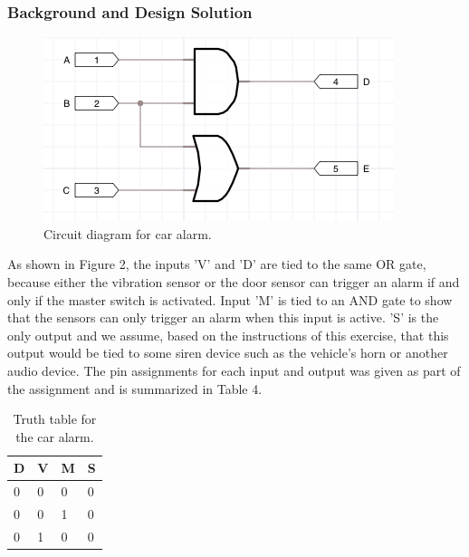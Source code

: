 \documentclass[11pt]{article}
\begin{document}
\subsubsection{Background and Design Solution}

\begin{figure}[h]
	\includegraphics[width=\textwidth]{report_images/img1}
	\caption{\label{fig:figure-name}Circuit diagram for car alarm.}
\end{figure}

As shown in Figure 2, the inputs 'V' and 'D' are tied to the same OR gate, because either the vibration sensor or the door sensor can trigger an alarm if and only if the master switch is activated. Input 'M' is tied to an AND gate to show that the sensors can only trigger an alarm when this input is active. 'S' is the only output and we assume, based on the instructions of this exercise, that this output would be tied to some siren device such as the vehicle's horn or another audio device. The pin assignments for each input and output was given as part of the assignment and is summarized in Table 4.

\begin{table}[h]
\begin{center}
	\begin{tabular}{| l | l | l | l |}
	\hline
	D & V & M & S \\ \hline
	0 & 0 & 0 & 0 \\ \hline
	0 & 0 & 1 & 0 \\ \hline
	0 & 1 & 0 & 0 \\ \hline	
	\end{tabular}
	\caption{\label{tab:table-name}Truth table for the car alarm.}
\end{center}
\end{table}
\end{document}
